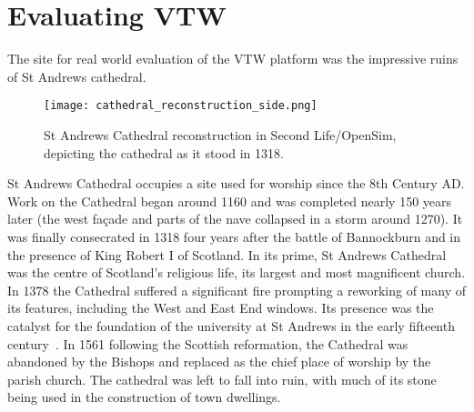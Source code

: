 \section{Evaluating VTW}

\newcommand{\thinkpadFootnote}{\footnote{\url{http://support.lenovo.com/us/en/documents/pd012148}}}

\newcommand{\wrtFootnote}{\footnote{\url{http://support.linksys.com/en-eu/support/routers/WRT54G}}}


The site for real world evaluation of the VTW platform was the impressive ruins of St Andrews cathedral.

\begin{figure}[h]
\centering
  \texttt{[image: cathedral\_reconstruction\_side.png]}
  \caption{St Andrews Cathedral reconstruction in Second Life/OpenSim, depicting the cathedral as it stood in 1318.}
  \label{cathedral_reconstruction_side.png}
\end{figure}



St Andrews Cathedral occupies a site used for worship since the 8th Century AD. Work on the Cathedral began around 1160 and was completed nearly 150 years later (the west fa\c{c}ade and parts of the nave collapsed in a storm around 1270). It was finally consecrated in 1318 four years after the battle of Bannockburn and in the presence of King Robert I of Scotland. In its prime, St Andrews Cathedral was the centre of Scotland's religious life, its largest and most magnificent church. In 1378 the Cathedral suffered a significant fire prompting
a reworking of many of its features, including the West and East End windows. Its presence was the catalyst for the foundation of the university at St Andrews in the early fifteenth century~\cite{Fawcett2011}. In 1561 following the Scottish reformation, the Cathedral was abandoned by the Bishops and replaced as the chief place of worship by the parish church. The cathedral was left to fall into ruin, with much of its stone being used in the construction of town dwellings.


